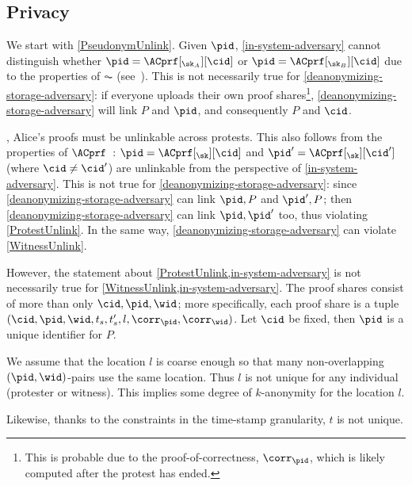 \subsection{Privacy}

We start with \cref{PseudonymUnlink}.
Given \(\pid\), \cref{in-system-adversary} cannot distinguish whether \(\pid = 
  \ACprf[_{\sk_A}][\cid]\) or \(\pid = \ACprf[_{\sk_B}][\cid]\) due to the 
properties of \(\AC\) (see~\cite{HowToWinTheCloneWars}).
This is not necessarily true for \cref{deanonymizing-storage-adversary}:
if everyone uploads their own proof shares\footnote{%
  This is probable due to the proof-of-correctness, \(\corr_\pid\), which is 
  likely computed after the protest has ended.
}, \cref{deanonymizing-storage-adversary} will link \(P\) and \(\pid\), and 
consequently \(P\) and \(\cid\).

, Alice's proofs must be unlinkable across protests.
This also follows from the properties of 
\(\ACprf\)~\cite{HowToWinTheCloneWars}: \(\pid =  \ACprf[_{\sk}][\cid]\) and 
\(\pid' = \ACprf[_{\sk}][\cid']\) (where \(\cid \neq \cid'\)) are unlinkable 
from the perspective of \cref{in-system-adversary}.
This is not true for \cref{deanonymizing-storage-adversary}: since 
\cref{deanonymizing-storage-adversary} can link \(\pid, P\) and \(\pid', P\); 
then \cref{deanonymizing-storage-adversary} can link \(\pid, \pid'\) too, thus 
violating \cref{ProtestUnlink}.
In the same way, \cref{deanonymizing-storage-adversary} can violate 
\cref{WitnessUnlink}.

However, the statement about \cref{ProtestUnlink,in-system-adversary} is not 
necessarily true for \cref{WitnessUnlink,in-system-adversary}.
The proof shares consist of more than only \(\cid, \pid, \wid\); more 
specifically, each proof share is a tuple \((\cid, \pid, \wid, t_s, t_s', l, 
  \corr_\pid, \corr_\wid)\).
Let \(\cid\) be fixed, then \(\pid\) is a unique identifier for \(P\).

We assume that the location \(l\) is coarse enough so that many non-overlapping 
\((\pid, \wid)\)-pairs use the same location.
Thus \(l\) is not unique for any individual (protester or witness).
This implies some degree of \(k\)-anonymity for the location \(l\).

Likewise, thanks to the constraints in the time-stamp granularity,
\(t\) is not unique.